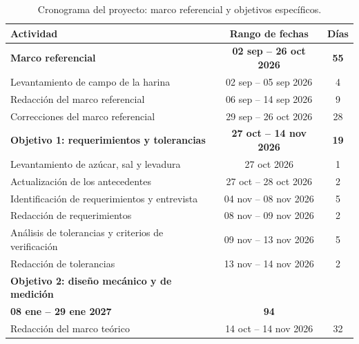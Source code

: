 \begin{table}[H]
    \caption{Cronograma del proyecto: marco referencial y objetivos específicos.}
    \label{tab:cronograma_proyecto}
    \centering
    \footnotesize
    \renewcommand{\arraystretch}{1.1}
    \begin{tabular}{lcc}
        \toprule[1pt]
        \textbf{Actividad} & \textbf{Rango de fechas} & \textbf{Días} \\
        \midrule[1pt]
        \rowcolor{lightgray!50}
        \textbf{Marco referencial} & \textbf{02 sep -- 26 oct 2026} & \textbf{55} \\
        \hspace{1em}Levantamiento de campo de la harina & 02 sep -- 05 sep 2026 & 4 \\
        \hspace{1em}Redacción del marco referencial & 06 sep -- 14 sep 2026 & 9 \\
        \hspace{1em}Correcciones del marco referencial & 29 sep -- 26 oct 2026 & 28 \\
        \rowcolor{lightgray!50}
        \textbf{Objetivo 1: requerimientos y tolerancias} & \textbf{27 oct -- 14 nov 2026} & \textbf{19} \\
        \hspace{1em}Levantamiento de azúcar, sal y levadura & 27 oct 2026 & 1 \\
        \hspace{1em}Actualización de los antecedentes & 27 oct -- 28 oct 2026 & 2 \\
        \hspace{1em}Identificación de requerimientos y entrevista & 04 nov -- 08 nov 2026 & 5 \\
        \hspace{1em}Redacción de requerimientos & 08 nov -- 09 nov 2026 & 2 \\
        \hspace{1em}Análisis de tolerancias y criterios de verificación & 09 nov -- 13 nov 2026 & 5 \\
        \hspace{1em}Redacción de tolerancias & 13 nov -- 14 nov 2026 & 2 \\
        \rowcolor{lightgray!50}
        \textbf{Objetivo 2: diseño mecánico y de medición} & \shortstack{\textbf{14 oct -- 24 dic 2026}\\\textbf{08 ene -- 29 ene 2027}} & \textbf{94} \\
        \hspace{1em}Redacción del marco teórico & 14 oct -- 14 nov 2026 & 32 \\

\end{tabular}
\end{table}
